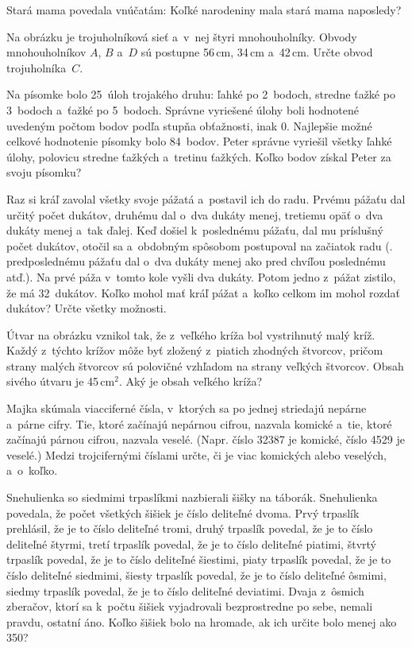 {%
Stará mama povedala vnúčatám: 
Koľké narodeniny mala stará mama naposledy?
}

{%
Na obrázku je trojuholníková sieť a~v~nej štyri mnohouholníky.
Obvody mnohouholníkov $A$, $B$ a~$D$ sú postupne 56\,cm, 34\,cm a~42\,cm.
Určte obvod trojuholníka~$C$.
%
}

{%
Na písomke bolo 25~úloh trojakého druhu: ľahké po 2~bodoch, stredne ťažké po 3~bodoch a~ťažké po 5~bodoch.
Správne vyriešené úlohy boli hodnotené uvedeným počtom bodov podľa stupňa obťažnosti, inak 0.
Najlepšie možné celkové hodnotenie písomky bolo 84~bodov.
Peter správne vyriešil všetky ľahké úlohy, polovicu stredne ťažkých a~tretinu ťažkých.
Koľko bodov získal Peter za svoju písomku?
}

{%
Raz si kráľ zavolal všetky svoje pážatá a~postavil ich do radu.
Prvému pážaťu dal určitý počet dukátov, druhému dal o~dva dukáty menej, tretiemu opäť o~dva dukáty menej a~tak ďalej.
Keď došiel k~poslednému pážaťu, dal mu príslušný počet dukátov, otočil sa a~obdobným spôsobom postupoval na začiatok radu
(\tj. predposlednému pážaťu dal o~dva dukáty menej ako pred chvíľou poslednému atď.).
Na prvé páža v~tomto kole vyšli dva dukáty.
Potom jedno z~pážat zistilo, že má 32~dukátov.
Koľko mohol mať kráľ pážat a~koľko celkom im mohol rozdať dukátov?
Určte všetky možnosti.
}

{%
Útvar na obrázku vznikol tak, že z~veľkého kríža bol vystrihnutý malý kríž.
Každý z~týchto krížov môže byť zložený z~piatich zhodných štvorcov, pričom strany malých štvorcov sú polovičné vzhľadom na strany veľkých štvorcov.
Obsah sivého útvaru je 45\,cm$^2$.
Aký je obsah veľkého kríža?
%
}

{%
Majka skúmala viacciferné čísla, v~ktorých sa po jednej striedajú nepárne a~párne cifry.
Tie, ktoré začínajú nepárnou cifrou, nazvala komické a~tie, ktoré začínajú párnou cifrou, nazvala veselé.
(Napr. číslo 32387 je komické, číslo 4529 je veselé.)
Medzi trojcifernými číslami určte, či je viac komických alebo veselých, a~o~koľko.
}

{%
Snehulienka so siedmimi trpaslíkmi nazbierali šišky na táborák.
Snehulienka povedala, že počet všetkých šišiek je číslo deliteľné dvoma.
Prvý trpaslík prehlásil, že je to číslo deliteľné tromi,
druhý trpaslík povedal, že je to číslo deliteľné štyrmi,
tretí trpaslík povedal, že je to číslo deliteľné piatimi,
štvrtý trpaslík povedal, že je to číslo deliteľné šiestimi,
piaty trpaslík povedal, že je to číslo deliteľné siedmimi,
šiesty trpaslík povedal, že je to číslo deliteľné ôsmimi,
siedmy trpaslík povedal, že je to číslo deliteľné deviatimi.
Dvaja z~ôsmich zberačov, ktorí sa k~počtu šišiek vyjadrovali bezprostredne po sebe, nemali pravdu, ostatní áno.
Koľko šišiek bolo na hromade, ak ich určite bolo menej ako 350?
}

